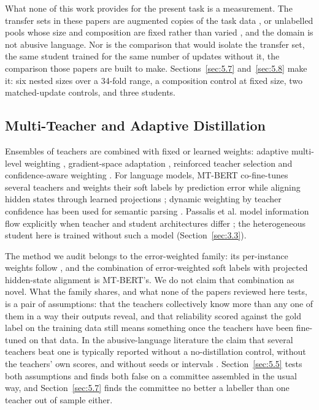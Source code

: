 What none of this work provides for the present task is a measurement. The transfer sets in these papers
are augmented copies of the task data \cite{jiao2020tinybert, tang2019distilling}, or unlabelled pools
whose size and composition are fixed rather than varied \cite{turc2019wellread}, and the domain is not
abusive language. Nor is the comparison that would isolate the transfer set, the same student trained
for the same number of updates without it, the comparison those papers are built to make.
Sections~\ref{sec:5.7} and~\ref{sec:5.8} make it: six nested sizes over a 34-fold range, a composition
control at fixed size, two matched-update controls, and three students.

\subsection{Multi-Teacher and Adaptive Distillation}
\label{sec:2.3}
Ensembles of teachers \cite{you2017learning, fukuda2017efficient} are combined with fixed or learned
weights: adaptive multi-level weighting \cite{liu2020adaptive}, gradient-space adaptation
\cite{du2020agree}, reinforced teacher selection \cite{yuan2021reinforced} and confidence-aware
weighting \cite{zhang2022confidence}. For language models, MT-BERT co-fine-tunes several teachers
and weights their soft labels by prediction error while aligning hidden states through learned
projections \cite{wu2021one}; dynamic weighting by teacher confidence has been used for semantic
parsing \cite{zou2025dynamic}. Passalis et al. model information flow explicitly when teacher and
student architectures differ \cite{passalis2020heterogeneous}; the heterogeneous student here is
trained without such a model (Section~\ref{sec:3.3}).

The method we audit belongs to the error-weighted family: its per-instance weights follow
\cite{wu2021one, zhang2022confidence}, and the combination of error-weighted soft labels with
projected hidden-state alignment is MT-BERT's. We do not claim that combination as novel. What the
family shares, and what none of the papers reviewed here tests, is a pair of assumptions: that the
teachers collectively know more than any one of them in a way their outputs reveal, and that
reliability scored against the gold label on the training data still means something once the
teachers have been fine-tuned on that data. In the abusive-language literature the claim that
several teachers beat one is typically reported without a no-distillation control, without the
teachers' own scores, and without seeds or intervals \cite{prasomphan2025mtkd}.
Section~\ref{sec:5.5} tests both assumptions and finds both false on a committee assembled in the
usual way, and Section~\ref{sec:5.7} finds the committee no better a labeller than one teacher out
of sample either.

